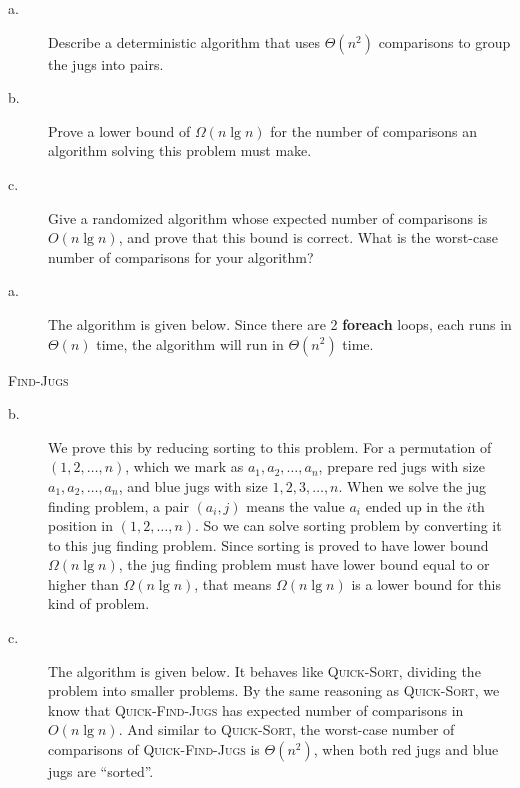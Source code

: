 \begin{description}
\item[a. \hspace{9pt}] Describe a deterministic algorithm that uses $\Theta(n^2)$ comparisons to group the jugs into pairs.


\item[b. \hspace{9pt}] Prove a lower bound of $\Omega(n \lg n)$ for the number of comparisons an algorithm solving this problem must make.

\item[c. \hspace{9pt}] Give a randomized algorithm whose expected number of comparisons is $O(n \lg n)$, and prove that this bound is correct. What is the worst-case number of
comparisons for your algorithm?

\end{description}

\answer

\begin{description}

\item[a. \hspace{9pt}] The algorithm is given below. Since there are 2 \textbf{foreach} loops, each runs in $\Theta(n)$ time, the algorithm will run in $\Theta(n^2)$ time.
\end{description}

\begin{algorithm}[H]
\caption{\textsc{Find-Jugs}}
\end{algorithm}

\begin{description}
\item[b. \hspace{9pt}] We prove this by reducing sorting to this problem. For a permutation of $(1, 2, \ldots, n)$, which we mark as $a_1, a_2, \ldots, a_n$, prepare red jugs
with size $a_1, a_2, \ldots, a_n$, and blue jugs with size $1, 2, 3, \ldots, n$. When we solve the jug finding problem, a pair $(a_i, j)$ means the value $a_i$ ended up in the
$i$th position in $(1, 2, \ldots, n)$. So we can solve sorting problem by converting it to this jug finding problem. Since sorting is proved to have lower bound $\Omega(n \lg n)$,
the jug finding problem must have lower bound equal to or higher than $\Omega(n \lg n)$, that means $\Omega(n \lg n)$ is a lower bound for this kind of problem.

\item[c. \hspace{9pt}] The algorithm is given below. It behaves like \textsc{Quick-Sort}, dividing the problem into smaller problems.
By the same reasoning as \textsc{Quick-Sort}, we know that \textsc{Quick-Find-Jugs} has expected number of comparisons in $O(n\lg n)$.
And similar to \textsc{Quick-Sort}, the worst-case number of comparisons of \textsc{Quick-Find-Jugs} is $\Theta(n^2)$, when both red jugs and blue jugs are ``sorted''.

\end{description}

